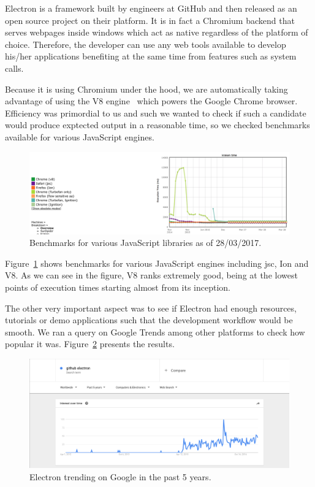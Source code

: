 \documentclass{l4proj}
\begin{document}
Electron is a framework built by engineers at GitHub and then released as an open source project on their platform. It is in fact a Chromium backend that serves webpages inside windows which act as native regardless of the platform of choice. Therefore, the developer can use any web tools available to develop his/her applications benefiting at the same time from features such as system calls.

Because it is using Chromium under the hood, we are automatically taking advantage of using the V8 engine~\cite{v8-chrome} which powers the Google Chrome browser. Efficiency was primordial to us and such we wanted to check if such a candidate would produce exptected output in a reasonable time, so we checked benchmarks available for various JavaScript engines.

\begin{figure}[!ht]
    \centering
    \includegraphics[scale=0.35]{v8-benchmark}
    \caption{Benchmarks for various JavaScript libraries as of 28/03/2017.}
    \label{fig:v8-benchmark}
\end{figure}

Figure~\ref{fig:v8-benchmark} shows benchmarks for various JavaScript engines including jsc, Ion and V8. As we can see in the
figure, V8 ranks extremely good, being at the lowest points of execution times starting almost from its inception.

The other very important aspect was to see if Electron had enough resources, tutorials or demo applications such that
the development workflow would be smooth.
We ran a query on Google Trends among other platforms to check how popular it was.
Figure~\ref{fig:google-trends-electron} presents the results.

\begin{figure}[!ht]
    \centering
    \includegraphics[scale=0.35]{google-trends-electron}
    \caption{Electron trending on Google in the past 5 years.}
    \label{fig:google-trends-electron}
\end{figure}
\end{document}
